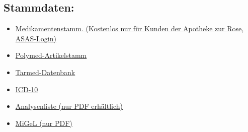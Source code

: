 \subsection{Stammdaten:}
\begin{itemize}
 \item \href{http://cug.zur-rose.ch/aerztegrossist/aerztegrossist.asp}{Medikamentenstamm. (Kostenlos nur für Kunden der Apotheke zur Rose,  ASAS-Login)}
\item \href{http://www.polymed.ch/d/aktuell/downloads.html}{Polymed-Artikelstamm}
\item \href{http://www.tarmedsuisse.ch/fileadmin/media/Dateien/Browser/TARMED_Database_1.03.zip}{Tarmed-Datenbank}
\item \href{http://www.dimdi.de/dynamic/de/klassi/downloadcenter/icd-10-gm/version2006/systematik/x1gea2006.zip}{ICD-10}
\item \href{http://www.famh.ch/liste_analyses_d_06.pdf}{Analysenliste (nur PDF erhältlich)}
\item \href{http://www.bag.admin.ch/themen/krankenversicherung/02874/index.html?lang=de&download=M3wBUQCu/8ulmKDu36WenojQ1NTTjaXZnqWfVpzLhmfhnapmmc7Zi6rZnqCkkIV6e3l9bKbXrZ2lhtTN34al3p6YrY7P1oah162apo3X1cjYh2+hoJVn6w==}{MiGeL (nur PDF)}
\end{itemize}

